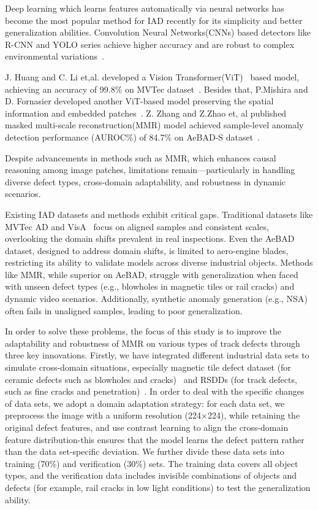 Deep learning which learns features automatically via neural networks has become the most popular method for IAD recently 
for its simplicity and better generalization abilities. Convolution Neural Networks(CNNs) based detectors like R-CNN and YOLO series
achieve higher accuracy and are robust to complex environmental variations~\cite{why-traditional-bad,survey-ml1}.

J. Huang and C. Li et,al. developed a Vision Transformer(ViT)~\cite{VIT} based model, achieving an accuracy of 99.8\% on MVTec dataset~\cite{VIT-model1}.
Besides that, P.Mishira and D. Fornasier developed another ViT-based model preserving the spatial information and embedded patches~\cite{VIT-model2}.
Z. Zhang and Z.Zhao et, al published masked multi-scale reconstruction(MMR) model 
achieved sample-level anomaly detection performance (AUROC\%) of 84.7\% on AeBAD-S dataset~\cite{MMR}. 

Despite advancements in methods such as MMR, which enhances causal reasoning among image patches, limitations remain—particularly in handling diverse defect types, cross-domain adaptability, and robustness in dynamic scenarios.

Existing IAD datasets and methods exhibit critical gaps. 
Traditional datasets like MVTec AD and VisA~\cite{MVTec-1,MVTec-2,VisA} focus on aligned samples and consistent scales, overlooking the domain shifts prevalent in real inspections. 
Even the AeBAD dataset, designed to address domain shifts, is limited to aero-engine blades, restricting its ability to validate models across diverse industrial objects. 
Methods like MMR, while superior on AeBAD, struggle with generalization when faced with unseen defect types (e.g., blowholes in magnetic tiles or rail cracks) and dynamic video scenarios. 
Additionally, synthetic anomaly generation (e.g., NSA) often fails in unaligned samples, leading to poor generalization.

In order to solve these problems, the focus of this study is to improve the adaptability and robustness of MMR on various types of track defects through three key innovations. 
Firstly, we have integrated different industrial data sets to simulate cross-domain situations, especially magnetic tile defect dataset (for ceramic defects such as blowholes and cracks)~\cite{MTD-dataset} and RSDDs (for track defects, such as fine cracks and penetration)~\cite{RSDDs}.
In order to deal with the specific changes of data sets, we adopt a domain adaptation strategy: for each data set, we preprocess the image with a uniform resolution (224×224), while retaining the original defect features, and use contrast learning to align the cross-domain feature distribution-this ensures that the model learns the defect pattern rather than the data set-specific deviation. 
We further divide these data sets into training (70\%) and verification (30\%) sets. The training data covers all object types, and the verification data includes invisible combinations of objects and defects (for example, rail cracks in low light conditions) to test the generalization ability.

